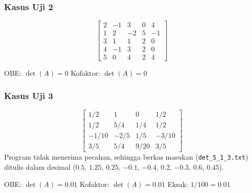 \subsubsection{Kasus Uji 2}
\begin{kasus}
\[
\begin{bmatrix}
2 & -1 & 3 & 0 & 4 \\
1 & 2 & -2 & 5 & -1 \\
3 & 1 & 1 & 2 & 0 \\
4 & -1 & 3 & 2 & 0 \\
5 & 0 & 4 & 2 & 4
\end{bmatrix}
\]
\begin{center}
OBE: $\det(A) = 0$ \qquad Kofaktor: $\det(A) = 0$
\end{center}
\begin{center}
    \begin{minipage}{0.48\textwidth}
        \centering
    \end{minipage}\hfill
    \begin{minipage}{0.48\textwidth}
        \centering
    \end{minipage}
\end{center}
\end{kasus}
\subsubsection{Kasus Uji 3}

\begin{kasus}
\[
\begin{bmatrix}
1/2 & 1 & 0 & 1/2 \\
1/2 & 5/4 & 1/4 & 1/2 \\
-1/10 & -2/5 & 1/5 & -3/10 \\
3/5 & 5/4 & 9/20 & 3/5
\end{bmatrix}
\]
Program tidak menerima pecahan, sehingga berkas masukan
(\texttt{det\_5\_1\_3.txt}) ditulis dalam desimal ($0.5$, $1.25$, $0.25$,
$-0.1$, $-0.4$, $0.2$, $-0.3$, $0.6$, $0.45$).
\begin{center}
OBE: $\det(A) = 0.01$ \qquad Kofaktor: $\det(A) = 0.01$ \qquad
Eksak: $1/100 = 0.01$
\end{center}
\begin{center}
    \begin{minipage}{0.48\textwidth}
        \centering
    \end{minipage}\hfill
    \begin{minipage}{0.48\textwidth}
        \centering
    \end{minipage}
\end{center}
\end{kasus}

